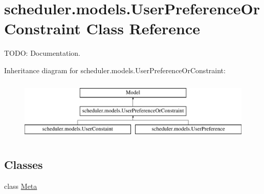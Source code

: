 \hypertarget{classscheduler_1_1models_1_1_user_preference_or_constraint}{\section{scheduler.\-models.\-User\-Preference\-Or\-Constraint Class Reference}
\label{classscheduler_1_1models_1_1_user_preference_or_constraint}
}


T\-O\-D\-O\-: Documentation.  


Inheritance diagram for scheduler.\-models.\-User\-Preference\-Or\-Constraint\-:\begin{figure}[H]
\begin{center}
\leavevmode
\includegraphics[height=2.947368cm]{classscheduler_1_1models_1_1_user_preference_or_constraint}
\end{center}
\end{figure}
\subsection*{Classes}
\begin{DoxyCompactItemize}
\item 
class \hyperlink{classscheduler_1_1models_1_1_user_preference_or_constraint_1_1_meta}{Meta}
\end{DoxyCompactItemize}
